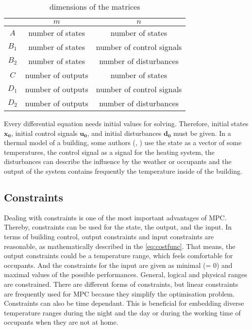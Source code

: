     \begin{table}[]
        \centering
        \begin{tabular}{c|c|c}
            & $m$ & $n$  \\
            \hline
            $A$ & number of states & number of states\\
            $B_\text{1}$ & number of states & number of control signals\\
            $B_\text{2}$ & number of states & number of disturbances\\
            $C$ & number of outputs & number of states\\
            $D_\text{1}$ & number of outputs & number of control signals\\
            $D_\text{2}$ & number of outputs & number of disturbances\\
        \end{tabular}
        \caption{dimensions of the matrices}
        \label{tab:matrixDim}
    \end{table}
    Every differential equation needs initial values for solving. Therefore, initial states $\mathbf{x_0}$, initial control signals $\mathbf{u_0}$, and initial disturbances $\mathbf{d_0}$ must be given.
    In a thermal model of a building, some authors (\cite{Hazyuk.2012}, \cite{Siroky.2011}) use the state as a vector of some temperatures, the control signal as a signal for the heating system, the disturbances can describe the influence by the weather or occupants and the output of the system contains frequently the temperature inside of the building.
    


\subsection{Constraints}
\label{subsection:constraints}

Dealing with constraints is one of the most important advantages of MPC. Thereby, constraints can be used for the state, the output, and the input. In terms of building control, output constraints and input constraints are reasonable, as mathematically described in the \autoref{eq:costfunc}. That means, the output constraints could be a temperature range, which feels comfortable for occupants. And the constraints for the input are given as minimal (= 0) and maximal values of the possible performances. General, logical and physical ranges are constrained. There are different forms of constraints, but linear constraints are frequently used for MPC because they simplify the optimisation problem. Constraints can also be time dependant. This is beneficial for embedding diverse temperature ranges during the night and the day or during the working time of occupants when they are not at home.
\cite{Siroky.2011}

